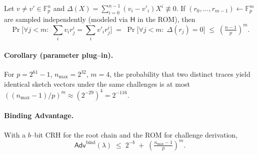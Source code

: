 \begin{theorem}
Let $v\neq v'\in\mathbb{F}_p^n$ and $\Delta(X)=\sum_{i=0}^{n-1}(v_i{-}v'_i)X^i\not\equiv 0$. If $(r_0,\ldots,r_{m-1})\leftarrow \mathbb{F}_p^m$ are sampled independently (modeled via $\mathsf{H}$ in the ROM), then
\[
\Pr\big[\forall j< m:\; \sum_i v_i r_j^i = \sum_i v'_i r_j^i\big] 
\;=\; \Pr\big[ \forall j< m:\; \Delta(r_j)=0\big] 
\;\le\; \left(\tfrac{n-1}{p}\right)^m.
\]
\end{theorem}

\paragraph{Corollary (parameter plug–in).}
For $p=2^{61}{-}1$, $n_{\max}=2^{32}$, $m{=}4$, the probability that two distinct traces yield identical sketch vectors under the same challenges is at most $((n_{\max}{-}1)/p)^m\approx (2^{-29})^4=2^{-116}$.

\paragraph{Binding Advantage.}
With a $b$–bit CRH for the root chain and the ROM for challenge derivation,
\[
\mathsf{Adv}^{\text{bind}}(\lambda) \;\le\; 2^{-b} \; + \; \left(\tfrac{n_{\max}-1}{p}\right)^m.
\]

